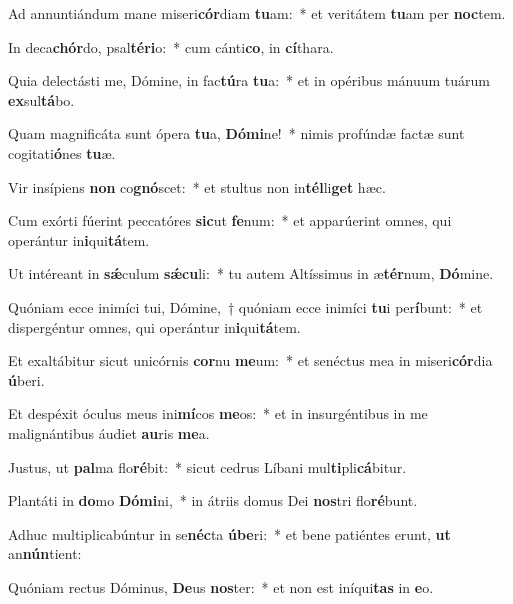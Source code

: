 \item Ad annuntiándum mane miseri\textbf{cór}diam \textbf{tu}am:~* et veritátem \textbf{tu}am per \textbf{noc}tem.
\item In deca\textbf{chór}do, psal\textbf{té}\textbf{ri}o:~* cum cánti\textbf{co}, in \textbf{cí}thara.
\item Quia delectásti me, Dómine, in fac\textbf{tú}ra \textbf{tu}a:~* et in opéribus mánuum tuárum \textbf{ex}sul\textbf{tá}bo.
\item Quam magnificáta sunt ópera \textbf{tu}a, \textbf{Dó}\textbf{mi}ne!~* nimis profúndæ factæ sunt cogitati\textbf{ó}nes \textbf{tu}æ.
\item Vir insípiens \textbf{non} co\textbf{gnó}scet:~* et stultus non in\textbf{tél}li\textbf{get} hæc.
\item Cum exórti fúerint peccatóres \textbf{sic}ut \textbf{fe}num:~* et apparúerint omnes, qui operántur in\textbf{i}qui\textbf{tá}tem.
\item Ut intéreant in \textbf{sǽ}culum \textbf{sǽ}\textbf{cu}li:~* tu autem Altíssimus in æ\textbf{tér}num, \textbf{Dó}mine.
\item Quóniam ecce inimíci tui, Dómine,~† quóniam ecce inimíci \textbf{tu}i per\textbf{í}bunt:~* et dispergéntur omnes, qui operántur in\textbf{i}qui\textbf{tá}tem.
\item Et exaltábitur sicut unicórnis \textbf{cor}nu \textbf{me}um:~* et senéctus mea in miseri\textbf{cór}dia \textbf{ú}beri.
\item Et despéxit óculus meus ini\textbf{mí}cos \textbf{me}os:~* et in insurgéntibus in me malignántibus áudiet \textbf{au}ris \textbf{me}a.
\item Justus, ut \textbf{pal}ma flo\textbf{ré}bit:~* sicut cedrus Líbani mul\textbf{ti}pli\textbf{cá}bitur.
\item Plantáti in \textbf{do}mo \textbf{Dó}\textbf{mi}ni,~* in átriis domus Dei \textbf{nos}tri flo\textbf{ré}bunt.
\item Adhuc multiplicabúntur in se\textbf{néc}ta \textbf{ú}\textbf{be}ri:~* et bene patiéntes erunt, \textbf{ut} an\textbf{nún}tient:
\item Quóniam rectus Dóminus, \textbf{De}us \textbf{nos}ter:~* et non est iníqui\textbf{tas} in \textbf{e}o.
